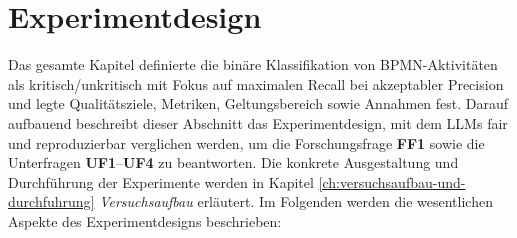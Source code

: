 \section{Experimentdesign}\label{sec:experimentdesign}

Das gesamte Kapitel definierte die binäre Klassifikation von \ac{BPMN}-Aktivitäten als kritisch/unkritisch mit Fokus auf maximalen Recall bei akzeptabler Precision und legte Qualitätsziele, Metriken, Geltungsbereich sowie Annahmen fest. Darauf aufbauend beschreibt dieser Abschnitt das Experimentdesign, mit dem \acp{LLM} fair und reproduzierbar verglichen werden, um die Forschungsfrage \textbf{FF1} sowie die Unterfragen \textbf{UF1}–\textbf{UF4} zu beantworten. Die konkrete Ausgestaltung und Durchführung der Experimente werden in Kapitel \ref{ch:versuchsaufbau-und-durchfuhrung} \emph{Versuchsaufbau} erläutert. Im Folgenden werden die wesentlichen Aspekte des Experimentdesigns beschrieben:

